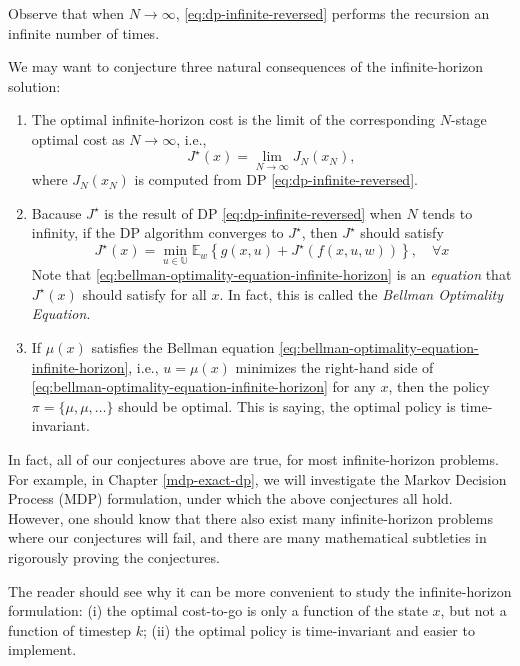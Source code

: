 \documentclass[
]{book}
\theoremstyle{definition}
\theoremstyle{definition}
\theoremstyle{definition}
\theoremstyle{definition}
\theoremstyle{remark}
\begin{document}
Observe that when \(N \rightarrow \infty\), \eqref{eq:dp-infinite-reversed} performs the recursion an infinite number of times.

We may want to conjecture three natural consequences of the infinite-horizon solution:

\begin{enumerate}
\def\labelenumi{\arabic{enumi}.}
\item
  The optimal infinite-horizon cost is the limit of the corresponding \(N\)-stage optimal cost as \(N \rightarrow \infty\), i.e.,
  \[
  J^\star(x) = \lim_{N \rightarrow \infty} J_N(x_N),
  \]
  where \(J_N(x_N)\) is computed from DP \eqref{eq:dp-infinite-reversed}.
\item
  Bacause \(J^\star\) is the result of DP \eqref{eq:dp-infinite-reversed} when \(N\) tends to infinity, if the DP algorithm converges to \(J^\star\), then \(J^\star\) should satisfy
  \begin{equation}
  J^\star(x) = \min_{u \in \mathbb{U}} \mathbb{E}_w \left\{ g(x,u) + J^\star(f(x,u,w)) \right\}, \quad \forall x
  \label{eq:bellman-optimality-equation-infinite-horizon}
  \end{equation}
  Note that \eqref{eq:bellman-optimality-equation-infinite-horizon} is an \emph{equation} that \(J^\star(x)\) should satisfy for all \(x\). In fact, this is called the \emph{Bellman Optimality Equation}.
\item
  If \(\mu(x)\) satisfies the Bellman equation \eqref{eq:bellman-optimality-equation-infinite-horizon}, i.e., \(u = \mu(x)\) minimizes the right-hand side of \eqref{eq:bellman-optimality-equation-infinite-horizon} for any \(x\), then the policy \(\pi = \{\mu,\mu,\dots \}\) should be optimal. This is saying, the optimal policy is time-invariant.
\end{enumerate}

In fact, all of our conjectures above are true, for most infinite-horizon problems. For example, in Chapter \ref{mdp-exact-dp}, we will investigate the Markov Decision Process (MDP) formulation, under which the above conjectures all hold. However, one should know that there also exist many infinite-horizon problems where our conjectures will fail, and there are many mathematical subtleties in rigorously proving the conjectures.

The reader should see why it can be more convenient to study the infinite-horizon formulation: (i) the optimal cost-to-go is only a function of the state \(x\), but not a function of timestep \(k\); (ii) the optimal policy is time-invariant and easier to implement.
\end{document}
